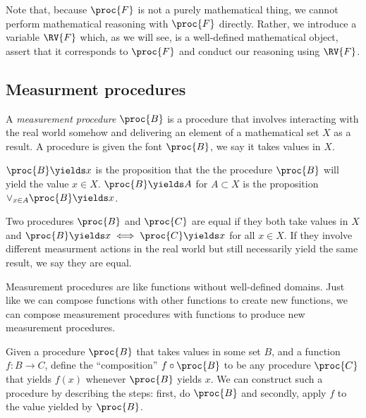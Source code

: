 Note that, because $\proc{F}$ is not a purely mathematical thing, we cannot perform mathematical reasoning with $\proc{F}$ directly. Rather, we introduce a variable $\RV{F}$ which, as we will see, is a well-defined mathematical object, assert that it corresponds to $\proc{F}$ and conduct our reasoning using $\RV{F}$.

\subsection{Measurment procedures}

\begin{definition}
A \emph{measurement procedure} $\proc{B}$ is a procedure that involves interacting with the real world somehow and delivering an element of a mathematical set $X$ as a result. A procedure is given the font $\proc{B}$, we say it takes values in $X$.
\end{definition}

\begin{definition}
$\proc{B}\yields x$ is the proposition that the the procedure $\proc{B}$ will yield the value $x\in X$. $\proc{B}\yields A$ for $A\subset X$ is the proposition $\lor_{x\in A} \proc{B}\yields x$.
\end{definition}

\begin{definition}\label{def:equality}
Two procedures $\proc{B}$ and $\proc{C}$ are equal if they both take values in $X$ and $\proc{B}\yields x\iff \proc{C}\yields x$ for all $x\in X$. If they involve different measurment actions in the real world but still necessarily yield the same result, we say they are equal.
\end{definition}

Measurement procedures are like functions without well-defined domains. Just like we can compose functions with other functions to create new functions, we can compose measurement procedures with functions to produce new measurement procedures.

\begin{definition}
Given a procedure $\proc{B}$ that takes values in some set $B$, and a function $f:B\to C$, define the ``composition'' $f\circ \proc{B}$ to be any procedure $\proc{C}$ that yields $f(x)$ whenever $\proc{B}$ yields $x$. We can construct such a procedure by describing the steps: first, do $\proc{B}$ and secondly, apply $f$ to the value yielded by $\proc{B}$.
\end{definition}

